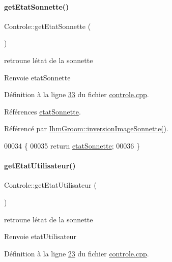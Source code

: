 \paragraph{\texorpdfstring{get\+Etat\+Sonnette()}{getEtatSonnette()}}
{\footnotesize\ttfamily Controle\+::get\+Etat\+Sonnette (\begin{DoxyParamCaption}{ }\end{DoxyParamCaption})}



retroune l\textquotesingle{}état de la sonnette 

\begin{DoxyReturn}{Renvoie}
etat\+Sonnette 
\end{DoxyReturn}


Définition à la ligne \hyperlink{controle_8cpp_source_l00033}{33} du fichier \hyperlink{controle_8cpp_source}{controle.\+cpp}.



Références \hyperlink{controle_8h_source_l00070}{etat\+Sonnette}.



Référencé par \hyperlink{ihmgroom_8cpp_source_l00201}{Ihm\+Groom\+::inversion\+Image\+Sonnette()}.


\begin{DoxyCode}
00034 \{
00035     \textcolor{keywordflow}{return} \hyperlink{class_controle_afddf1dce812ff88577e308684b564f33}{etatSonnette};
00036 \}
\end{DoxyCode}
\mbox{\label{class_controle_ac3bd8e8621cee56d4343e21a624e1c48}} 
\paragraph{\texorpdfstring{get\+Etat\+Utilisateur()}{getEtatUtilisateur()}}
{\footnotesize\ttfamily Controle\+::get\+Etat\+Utilisateur (\begin{DoxyParamCaption}{ }\end{DoxyParamCaption})}



retroune l\textquotesingle{}état de la sonnette 

\begin{DoxyReturn}{Renvoie}
etat\+Utilisateur 
\end{DoxyReturn}


Définition à la ligne \hyperlink{controle_8cpp_source_l00023}{23} du fichier \hyperlink{controle_8cpp_source}{controle.\+cpp}.



